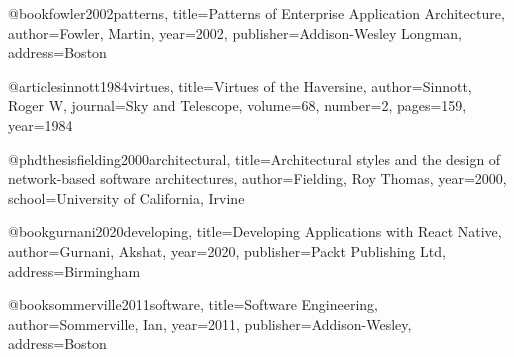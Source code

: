 @book{fowler2002patterns,
  title={Patterns of Enterprise Application Architecture},
  author={Fowler, Martin},
  year={2002},
  publisher={Addison-Wesley Longman},
  address={Boston}
}

@article{sinnott1984virtues,
  title={Virtues of the Haversine},
  author={Sinnott, Roger W},
  journal={Sky and Telescope},
  volume={68},
  number={2},
  pages={159},
  year={1984}
}

@phdthesis{fielding2000architectural,
  title={Architectural styles and the design of network-based software architectures},
  author={Fielding, Roy Thomas},
  year={2000},
  school={University of California, Irvine}
}

@book{gurnani2020developing,
  title={Developing Applications with React Native},
  author={Gurnani, Akshat},
  year={2020},
  publisher={Packt Publishing Ltd},
  address={Birmingham}
}

@book{sommerville2011software,
  title={Software Engineering},
  author={Sommerville, Ian},
  year={2011},
  publisher={Addison-Wesley},
  address={Boston}
}

